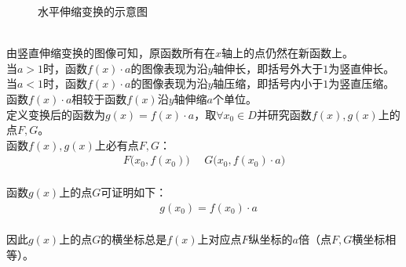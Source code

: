 \documentclass[UTF8]{ctexart}
\begin{document}
\begin{figure}[h]
\begin{center}
{
            }
            \caption{水平伸缩变换的示意图}
        \end{center}
    \end{figure}\\
    由竖直伸缩变换的图像可知，原函数所有在$x$轴上的点仍然在新函数上。\\[3mm]
    当$a>1$时，函数$f(x)\cdot a$的图像表现为沿$y$轴伸长，即括号外大于$1$为竖直伸长。\\[3mm]
    当$a<1$时，函数$f(x)\cdot a$的图像表现为沿$y$轴压缩，即括号内小于$1$为竖直压缩。\\[3mm]
    函数$f(x)\cdot a$相较于函数$f(x)$沿$y$轴伸缩$a$个单位。\\[7mm]
    定义变换后的函数为$g(x)=f(x)\cdot a$，取$\forall x_0\in D$并研究函数$f(x),g(x)$上的点$F,G$。\\[3mm]
    函数$f(x),g(x)$上必有点$F,G$：
    \begin{align}
        F\big(x_0,f(x_0)\big)~~~~~~G\big(x_0,f(x_0)\cdot a\big)
    \end{align}\\
    函数$g(x)$上的点$G$可证明如下：
    \begin{align}
        &g(x_0)=f(x_0)\cdot a
    \end{align}\\
    因此$g(x)$上的点$G$的横坐标总是$f(x)$上对应点$F$纵坐标的$a$倍（点$F,G$横坐标相等）。

\newpage
\end{document}
